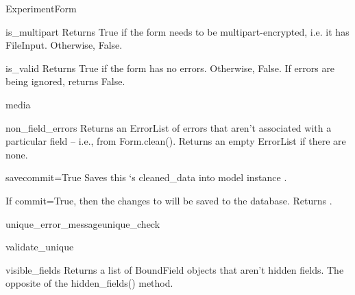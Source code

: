\documentclass[letterpaper,10pt,english]{sphinxmanual}
\begin{document}
\begin{classdesc}{ExperimentForm}
\hypertarget{data.forms.ExperimentForm.is_multipart}{}\begin{methoddesc}[ExperimentForm]{is\_multipart}{}
Returns True if the form needs to be multipart-encrypted, i.e. it has
FileInput. Otherwise, False.
\end{methoddesc}

\hypertarget{data.forms.ExperimentForm.is_valid}{}\begin{methoddesc}[ExperimentForm]{is\_valid}{}
Returns True if the form has no errors. Otherwise, False. If errors are
being ignored, returns False.
\end{methoddesc}

\hypertarget{data.forms.ExperimentForm.media}{}\begin{memberdesc}[ExperimentForm]{media}\end{memberdesc}

\hypertarget{data.forms.ExperimentForm.non_field_errors}{}\begin{methoddesc}[ExperimentForm]{non\_field\_errors}{}
Returns an ErrorList of errors that aren't associated with a particular
field -- i.e., from Form.clean(). Returns an empty ErrorList if there
are none.
\end{methoddesc}

\hypertarget{data.forms.ExperimentForm.save}{}\begin{methoddesc}[ExperimentForm]{save}{commit=True}
Saves this `s cleaned\_data into model instance
.

If commit=True, then the changes to  will be saved to the
database. Returns .
\end{methoddesc}

\hypertarget{data.forms.ExperimentForm.unique_error_message}{}\begin{methoddesc}[ExperimentForm]{unique\_error\_message}{unique\_check}\end{methoddesc}

\hypertarget{data.forms.ExperimentForm.validate_unique}{}\begin{methoddesc}[ExperimentForm]{validate\_unique}{}\end{methoddesc}

\hypertarget{data.forms.ExperimentForm.visible_fields}{}\begin{methoddesc}[ExperimentForm]{visible\_fields}{}
Returns a list of BoundField objects that aren't hidden fields.
The opposite of the hidden\_fields() method.
\end{methoddesc}
\end{classdesc}
\end{document}
